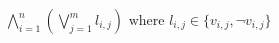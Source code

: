 \documentclass[border=1pt]{standalone}
\begin{document}
$\bigwedge_{i=1}^n \left(\bigvee_{j=1}^m l_{i,j}\right) \text{ where } l_{i,j}\in \{v_{i,j},\neg v_{i,j}\}$
\end{document}
